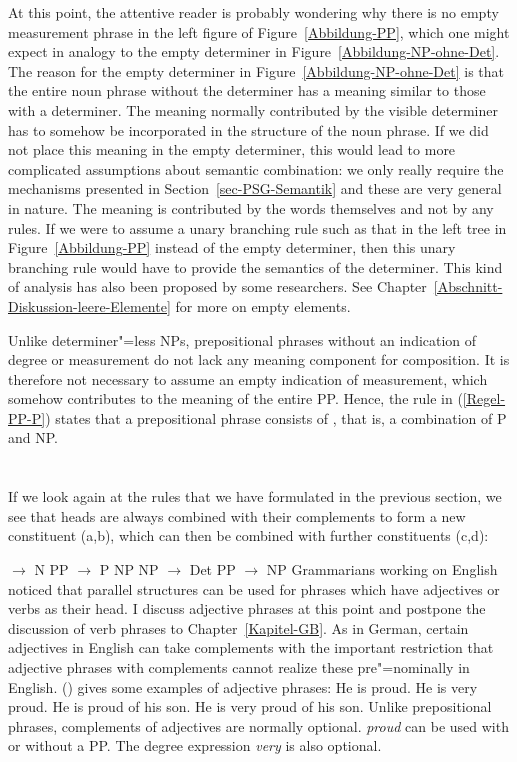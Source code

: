 At this point, the attentive reader is probably wondering why there is no empty measurement phrase in
the left figure of Figure~\ref{Abbildung-PP}, which one might expect in analogy to the empty determiner in Figure~\ref{Abbildung-NP-ohne-Det}.
The reason for the empty determiner in Figure~\ref{Abbildung-NP-ohne-Det} is that the entire noun phrase
without the determiner has a meaning similar to those with a determiner. The meaning normally contributed
by the visible determiner has to somehow be incorporated in the structure of the noun phrase. If we
did not place this meaning in the empty determiner, this would lead to more complicated assumptions about semantic
combination: we only really require the mechanisms presented in Section~\ref{sec-PSG-Semantik} and these are
very general in nature. The meaning is contributed by the words themselves and not by any rules. If we were
to assume a unary branching rule such as that in the left tree in Figure~\ref{Abbildung-PP} instead of the
empty determiner, then this unary branching rule would have to provide the semantics of the determiner. This
kind of analysis has also been proposed by some researchers. See Chapter~\ref{Abschnitt-Diskussion-leere-Elemente} for
more on empty elements.

Unlike determiner"=less NPs, prepositional phrases without an indication of degree or measurement do
not lack any meaning component for composition. It is therefore not necessary to assume an empty indication of measurement, which
somehow contributes to the meaning of the entire PP. Hence, the rule in (\ref{Regel-PP-P}) states that a
prepositional phrase consists of \pbar, that is, a combination of P and NP.

\section{\xbart}
\label{sec-xbar}

If  we look again at the rules that we have formulated in the previous section, we see that heads are always 
combined with their complements to form a new constituent (a,b), which can then be combined with further constituents (c,d):

\eal
\ex \nbar $\to$ N PP
\ex \pbar $\to$ P NP
\ex\label{Regel-NP-Xbar}
    NP $\to$ Det \nbar
\ex PP $\to$ NP \pbar
\zl
%
Grammarians working on English noticed that parallel structures can be used for phrases which have adjectives or verbs as their head.
I discuss adjective phrases at this point and postpone the discussion of verb phrases to Chapter~\ref{Kapitel-GB}. As in German, certain adjectives 
in English can take complements with the important restriction that adjective phrases with complements cannot realize these pre"=nominally in English. 
() gives some examples of adjective phrases:
\eal
\ex He is proud.
\ex He is very proud.
\ex He is proud of his son.
\ex He is very proud of his son.
\zl
Unlike prepositional phrases, complements of adjectives are normally optional. \emph{proud} can be used with or without a PP.
The degree expression \emph{very} is also optional.

